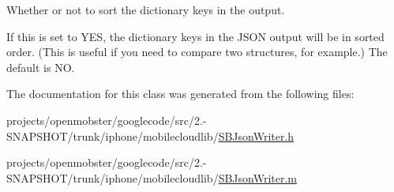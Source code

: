 \-Whether or not to sort the dictionary keys in the output. 

\-If this is set to \-Y\-E\-S, the dictionary keys in the \-J\-S\-O\-N output will be in sorted order. (\-This is useful if you need to compare two structures, for example.) \-The default is \-N\-O. 

\-The documentation for this class was generated from the following files\-:\begin{DoxyCompactItemize}
\item 
projects/openmobster/googlecode/src/2.-\/\-S\-N\-A\-P\-S\-H\-O\-T/trunk/iphone/mobilecloudlib/\hyperlink{_s_b_json_writer_8h}{\-S\-B\-Json\-Writer.\-h}\item 
projects/openmobster/googlecode/src/2.-\/\-S\-N\-A\-P\-S\-H\-O\-T/trunk/iphone/mobilecloudlib/\hyperlink{_s_b_json_writer_8m}{\-S\-B\-Json\-Writer.\-m}\end{DoxyCompactItemize}
